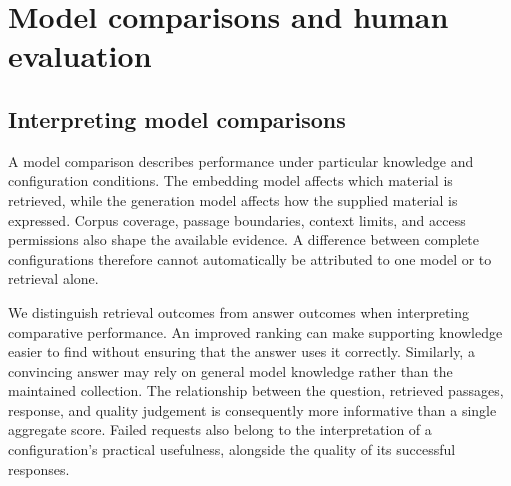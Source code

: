 \section{Model comparisons and human evaluation}

\subsection{Interpreting model comparisons}

A model comparison describes performance under particular knowledge and configuration conditions. The embedding model affects which material is retrieved, while the generation model affects how the supplied material is expressed. Corpus coverage, passage boundaries, context limits, and access permissions also shape the available evidence. A difference between complete configurations therefore cannot automatically be attributed to one model or to retrieval alone.

We distinguish retrieval outcomes from answer outcomes when interpreting comparative performance. An improved ranking can make supporting knowledge easier to find without ensuring that the answer uses it correctly. Similarly, a convincing answer may rely on general model knowledge rather than the maintained collection. The relationship between the question, retrieved passages, response, and quality judgement is consequently more informative than a single aggregate score. Failed requests also belong to the interpretation of a configuration's practical usefulness, alongside the quality of its successful responses.


